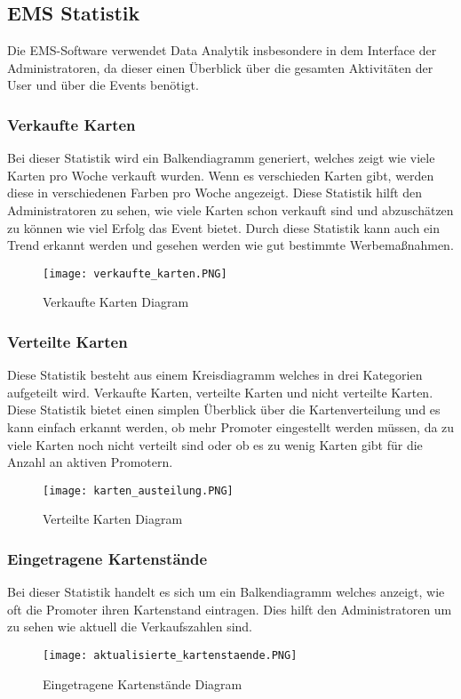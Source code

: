 \subsection{EMS Statistik}
Die EMS-Software verwendet Data Analytik insbesondere in dem Interface der Administratoren, da dieser einen Überblick über die gesamten Aktivitäten der User und über die Events benötigt.  			
\subsubsection{Verkaufte Karten}
Bei dieser Statistik wird ein Balkendiagramm generiert, welches zeigt wie viele Karten pro Woche verkauft wurden. Wenn es verschieden Karten gibt, werden diese in verschiedenen Farben pro Woche angezeigt. 
Diese Statistik hilft den Administratoren zu sehen, wie viele Karten schon verkauft sind und abzuschätzen zu können wie viel Erfolg das Event bietet. Durch diese Statistik kann auch ein Trend erkannt werden und gesehen werden wie gut bestimmte Werbemaßnahmen.	
\begin{figure}[H]
	\centering
	\texttt{[image: verkaufte\_karten.PNG]}
	\caption{Verkaufte Karten Diagram}
\end{figure}
\subsubsection{Verteilte Karten}
Diese Statistik besteht aus einem Kreisdiagramm welches in drei Kategorien aufgeteilt wird. Verkaufte Karten, verteilte Karten und nicht verteilte Karten. 
Diese Statistik bietet einen simplen Überblick über die Kartenverteilung und es kann einfach erkannt werden, ob mehr Promoter eingestellt werden müssen, da zu viele Karten noch nicht verteilt sind oder ob es zu wenig Karten gibt für die Anzahl an aktiven Promotern. 	
\begin{figure}[H]
	\centering
	\texttt{[image: karten\_austeilung.PNG]}
	\caption{Verteilte Karten Diagram}
	\end{figure}
\subsubsection{Eingetragene Kartenstände}
Bei dieser Statistik handelt es sich um ein Balkendiagramm welches anzeigt, wie oft die Promoter ihren Kartenstand eintragen. Dies hilft den Administratoren um zu sehen wie aktuell die Verkaufszahlen sind.
\begin{figure}[H]
	\centering
	\texttt{[image: aktualisierte\_kartenstaende.PNG]}
	\caption{Eingetragene Kartenstände Diagram}
\end{figure}
